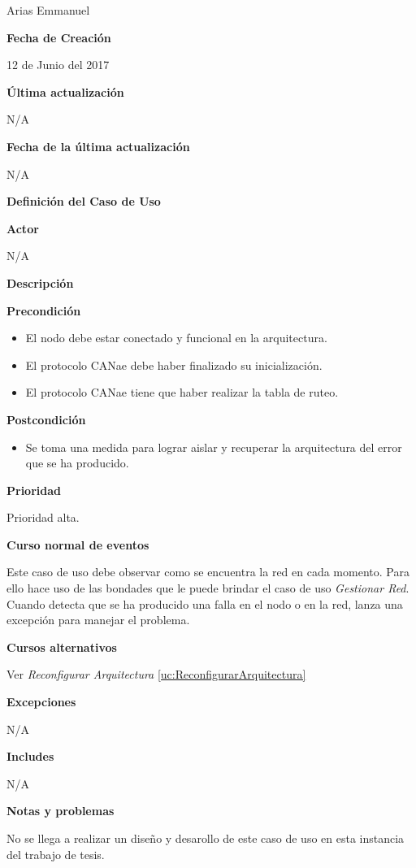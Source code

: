 Arias Emmanuel

\large\textbf{Fecha de Creación}
\vspace{3mm}

12 de Junio del 2017

\large\textbf{Última actualización}
\vspace{3mm}

N/A

\large\textbf{Fecha de la última actualización}
\vspace{3mm}

N/A

\Large\textbf{Definición del Caso de Uso}
\vspace{3mm}

\large\textbf{Actor}
\vspace{3mm}

N/A

\large\textbf{Descripción}
\vspace{3mm}



\large\textbf{Precondición}
\begin{itemize}
\item El nodo debe estar conectado y funcional en la arquitectura.
\item El protocolo CANae debe haber finalizado su inicialización.
\item El protocolo CANae tiene que haber realizar la tabla de ruteo.
\end{itemize}

\large\textbf{Postcondición}
\begin{itemize}
\item Se toma una medida para lograr aislar y recuperar la arquitectura
  del error que se ha producido.
\end{itemize}
\large\textbf{Prioridad}
\vspace{3mm}

Prioridad alta.

\large\textbf{Curso normal de eventos}
\vspace{3mm}

Este caso de uso debe observar como se encuentra la red en cada momento. Para
ello hace uso de las bondades que le puede brindar el caso de uso \textit{
  Gestionar Red}. Cuando detecta que se ha producido una falla en el nodo o en la red,
lanza una excepción para manejar el problema. 

\large\textbf{Cursos alternativos}
\vspace{3mm}

Ver \textit{Reconfigurar Arquitectura} \ref{uc:ReconfigurarArquitectura}

\large\textbf{Excepciones}
\vspace{3mm}

N/A

\large\textbf{Includes}
\vspace{3mm}

N/A

\large\textbf{Notas y problemas}
\vspace{3mm}

No se llega a realizar un diseño y desarollo de este caso de uso
en esta instancia del trabajo de tesis.
